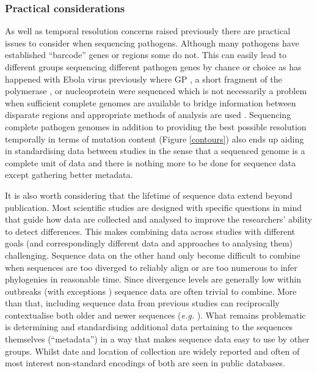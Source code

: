 \documentclass{bmcart}
\begin{document}
\subsubsection*{Practical considerations}
As well as temporal resolution concerns raised previously there are practical issues to consider when sequencing pathogens.
Although many pathogens have established ``barcode'' genes or regions \cite{towner_rapid_2004} some do not.
This can easily lead to different groups sequencing different pathogen genes by chance or choice as has happened with Ebola virus previously where GP \cite{georges-courbot_isolation_1997}, a short fragment of the polymerase \cite{leroy_fruit_2005}, or nucleoprotein \cite{rouquet_wild_2005} were sequenced which is not necessarily a problem when sufficient complete genomes are available to bridge information between disparate regions and appropriate methods of analysis are used \cite{dudas_phylogenetic_2014}.
Sequencing complete pathogen genomes in addition to providing the best possible resolution temporally in terms of mutation content (Figure \ref{contours}) also ends up aiding in standardising data between studies in the sense that a sequenced genome is a complete unit of data and there is nothing more to be done for sequence data except gathering better metadata.

It is also worth considering that the lifetime of sequence data extend beyond publication.
Most scientific studies are designed with specific questions in mind that guide how data are collected and analysed to improve the researchers' ability to detect differences.
This makes combining data across studies with different goals (and correspondingly different data and approaches to analysing them) challenging.
Sequence data on the other hand only become difficult to combine when sequences are too diverged to reliably align or are too numerous to infer phylogenies in reasonable time.
Since divergence levels are generally low within outbreaks (with exceptions \cite{andersen_clinical_2015}) sequence data are often trivial to combine.
More than that, including sequence data from previous studies can reciprocally contextualise both older and newer sequences (\textit{e.g.} \cite{mena_origins_2016}).
What remains problematic is determining and standardising additional data pertaining to the sequences themselves (``metadata'') in a way that makes sequence data easy to use by other groups.
Whilst date and location of collection are widely reported and often of most interest non-standard encodings of both are seen in public databases.
\end{document}
